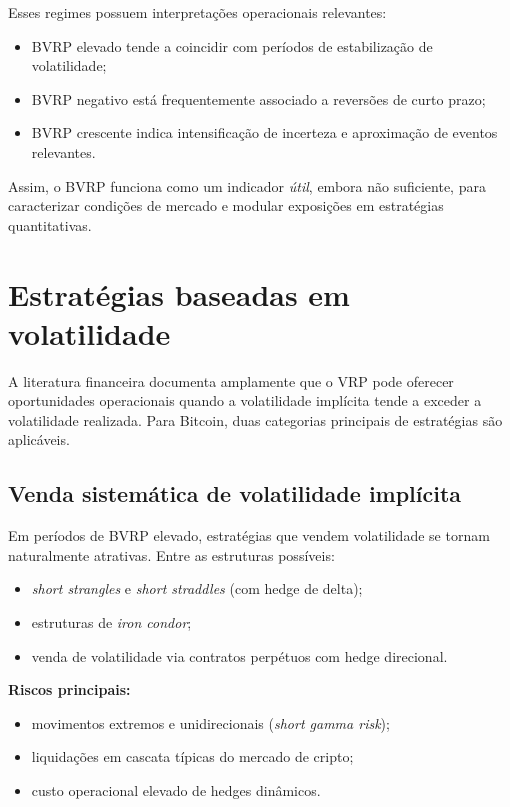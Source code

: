 Esses regimes possuem interpretações operacionais relevantes:

\begin{itemize}
    \item BVRP elevado tende a coincidir com períodos de estabilização de volatilidade;
    \item BVRP negativo está frequentemente associado a reversões de curto prazo;
    \item BVRP crescente indica intensificação de incerteza e aproximação de eventos relevantes.
\end{itemize}

Assim, o BVRP funciona como um indicador \emph{útil}, embora não suficiente,
para caracterizar condições de mercado e modular exposições em estratégias
quantitativas.

\section{Estratégias baseadas em volatilidade}

A literatura financeira documenta amplamente que o VRP pode oferecer
oportunidades operacionais quando a volatilidade implícita tende a exceder a
volatilidade realizada. Para Bitcoin, duas categorias principais de estratégias
são aplicáveis.

\subsection{Venda sistemática de volatilidade implícita}

Em períodos de BVRP elevado, estratégias que vendem volatilidade se tornam
naturalmente atrativas. Entre as estruturas possíveis:

\begin{itemize}
    \item \textit{short strangles} e \textit{short straddles} (com hedge de delta);
    \item estruturas de \textit{iron condor};
    \item venda de volatilidade via contratos perpétuos com hedge direcional.
\end{itemize}

\textbf{Riscos principais:}

\begin{itemize}
    \item movimentos extremos e unidirecionais (\textit{short gamma risk});
    \item liquidações em cascata típicas do mercado de cripto;
    \item custo operacional elevado de hedges dinâmicos.
\end{itemize}

